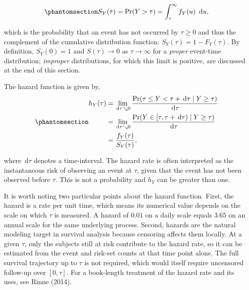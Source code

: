 \documentclass[
  letterpaper,
  krantz2]{style/krantz}
\begin{document}
\begin{equation}\phantomsection\label{eq-surv-prob}{
S_Y(\tau) = \Pr(Y > \tau) = \int^\infty_\tau f_Y(u) \ \,\mathrm{d}u,
}\end{equation}

which is the probability that an event has not occurred by
\(\tau \geq 0\) and thus the complement of the cumulative distribution
function: \(S_Y(\tau) = 1-F_Y(\tau)\). By definition, \(S_Y(0)=1\) and
\(S(\tau)\rightarrow 0\) as \(\tau \rightarrow \infty\) for a
\emph{proper} event-time distribution; \emph{improper} distributions,
for which this limit is positive, are discussed at the end of this
section.

The hazard function is given by,
\begin{equation}\phantomsection\label{eq-continuous-hazard}{
\begin{aligned}
h_Y(\tau) &= \lim_{\,\mathrm{d}\tau\searrow 0}\frac{\Pr(\tau  \leq Y < \tau + \,\mathrm{d}\tau\mid Y \geq \tau)}{\,\mathrm{d}\tau} \\
          &= \lim_{\,\mathrm{d}\tau\searrow 0}\frac{\Pr(Y \in [\tau, \tau + \,\mathrm{d}\tau) \mid Y \geq \tau)}{\,\mathrm{d}\tau}\\
          & = \frac{f_Y(\tau)}{S_Y(\tau)},
\end{aligned}
}\end{equation}

where \(\,\mathrm{d}\tau\) denotes a time-interval. The hazard rate is
often interpreted as the instantaneous risk of observing an event at
\(\tau\), given that the event has not been observed before \(\tau\).
This is not a probability and \(h_Y\) can be greater than one.

It is worth noting two particular points about the hazard function.
First, the hazard is a rate per unit time, which means its numerical
value depends on the scale on which \(\tau\) is measured. A hazard of
\(0.01\) on a daily scale equals \(3.65\) on an annual scale for the
same underlying process. Second, hazards are the natural modeling target
in survival analysis because censoring affects them locally. At a given
\(\tau\), only the subjects still at risk contribute to the hazard rate,
so it can be estimated from the event and risk-set counts at that time
point alone. The full survival trajectory up to \(\tau\) is not
required, which would itself require uncensored follow-up over
\([0, \tau]\). For a book-length treatment of the hazard rate and its
uses, see Rinne (2014).
\end{document}
